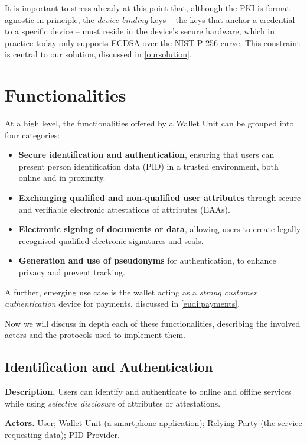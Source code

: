 \documentclass[binding=0.6cm,oneside,noexaminfo]{sapthesis}
\begin{document}
It is important to stress already at this point that, although the PKI is format-agnostic in principle, the
\emph{device-binding} keys -- the keys that anchor a credential to a specific device -- must reside in the device's
secure hardware, which in practice today only supports ECDSA over the NIST P-256 curve. This constraint is central to
our solution, discussed in \cref{oursolution}.

\section{Functionalities}
\label{eudi:functionalities}
At a high level, the functionalities offered by a Wallet Unit can be grouped into four categories:
\begin{itemize}[noitemsep]
  \item \textbf{Secure identification and authentication}, ensuring that users can present person identification data
        (PID) in a trusted environment, both online and in proximity.
  \item \textbf{Exchanging qualified and non-qualified user attributes} through secure and verifiable electronic
        attestations of attributes (EAAs).
  \item \textbf{Electronic signing of documents or data}, allowing users to create legally recognised qualified
        electronic signatures and seals.
  \item \textbf{Generation and use of pseudonyms} for authentication, to enhance privacy and prevent tracking.
\end{itemize}
A further, emerging use case is the wallet acting as a \emph{strong customer authentication} device for payments,
discussed in \cref{eudi:payments}.

Now we will discuss in depth each of these functionalities, describing the involved actors and the protocols used to implement them.

\subsection{Identification and Authentication}
\label{eudi:auth}
\textbf{Description.} Users can identify and authenticate to online and offline services while using
\emph{selective disclosure} of attributes or attestations.

\textbf{Actors.} User; Wallet Unit (a smartphone application); Relying Party (the service requesting data); PID Provider.
\end{document}

